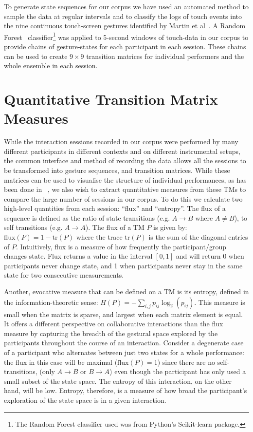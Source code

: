 \documentclass{sigchi}
\begin{document}
To generate state sequences for our corpus we have used an automated
method to sample the data at regular intervals and to classify the logs of touch events
into the nine continuous touch-screen gestures identified by Martin et
al~\cite{Martin:2015jk}. A Random Forest~\cite{Breiman:2001kx}
classifier\footnote{The Random Forest classifier used was from
  Python's Scikit-learn package\cite{scikit-learn}.} was applied to
5-second windows of touch-data in our corpus to provide chains of
gesture-states for each participant in each session. These chains can
be used to create $9 \times 9$ transition matrices for individual
performers and the whole ensemble in each session.

\section{Quantitative Transition Matrix Measures}
\label{sec:underst-impr-group}

While the interaction sessions recorded in our corpus were performed
by many different participants in
different contexts and on different instrumental setups, the common
interface and method of recording the data allows all the sessions to
be transformed into gesture sequences, and transition matrices. While
these matrices can be used to visualise the structure of individual
performances, as has been done in ~\cite{Swift:2014tya}, we also wish to extract quantitative
measures from these TMs to compare the large number of sessions in our
corpus.
To do this we calculate two high-level quantities from each session:
``flux'' and ``entropy''. The flux of a sequence is defined as the
ratio of state transitions (e.g. $A \rightarrow B$ where $A \neq B$),
to self transitions (e.g. $A \rightarrow A $). The flux of a TM $P$ is
given by: $\mathrm{flux}(P) = 1 - \mathrm{tr}(P)$ where the trace
$\mathrm{tr}(P)$ is the sum of the diagonal entries of $P$.
Intuitively, flux is a measure of how frequently the participant/group
changes state. Flux returns a value in the interval $[0,1]$ and will
return 0 when participants never change state, and 1 when participants
never stay in the same state for two consecutive measurements.

Another, evocative measure that can be defined on a TM is its
entropy, defined in the information-theoretic\cite{Shannon:1948rt}
sense: $H(P) = -\sum_{i,j}p_{ij}\log_2(p_{ij})$. This measure
is small when the matrix is sparse, and largest when each matrix
element is equal. It offers a different perspective on collaborative
interactions than the flux measure by capturing the breadth of the
gestural space explored by the participants throughout the course of
an interaction. Consider a degenerate case of a participant who
alternates between just two states for a whole performance: the flux in
this case will be maximal ($\mathrm{flux}(P) = 1$) since there are no
self-transitions, (only $A \rightarrow B$ or $ B \rightarrow A$) even
though the participant has only used a small subset of the state
space. The entropy of this interaction, on the other hand, will be
low. Entropy, therefore, is a measure of how broad the participant's
exploration of the state space is in a given interaction.
\end{document}

